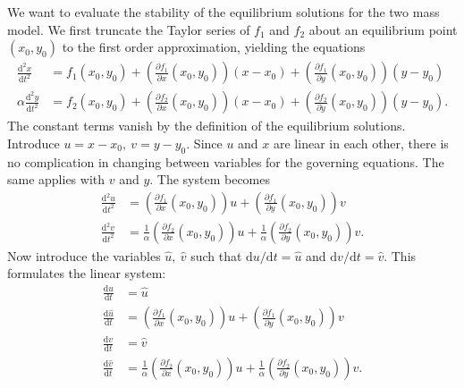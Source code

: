 \documentclass{article}
\begin{document}
We want to evaluate the stability of the equilibrium solutions for the two mass model.
We first truncate the Taylor series of \(f_1\) and \(f_2\) about an equilibrium point \((x_0,y_0)\) to the first order approximation, yielding the equations
\begin{equation}
    \begin{aligned}
        \frac{\mathrm{d}^2x}{\mathrm{d}t^2} &= f_1(x_0,y_0) + \left(\frac{\partial f_1}{\partial x}(x_0,y_0)\right)(x-x_0) + \left(\frac{\partial f_1}{\partial y}(x_0,y_0)\right)(y-y_0) \\
        \alpha\frac{\mathrm{d}^2y}{\mathrm{d}t^2} &= f_2(x_0,y_0) + \left(\frac{\partial f_2}{\partial x}(x_0,y_0)\right)(x-x_0) + \left(\frac{\partial f_2}{\partial y}(x_0,y_0)\right)(y-y_0).
    \end{aligned}
\end{equation}
The constant terms vanish by the definition of the equilibrium solutions.
Introduce \(u = x-x_0,~v=y-y_0\).
Since $u$ and $x$ are linear in each other, there is no complication in changing between variables for the governing equations.
The same applies with $v$ and $y$.
The system becomes
\begin{equation}
    \begin{aligned}
        \frac{\mathrm{d}^2u}{\mathrm{d}t^2} &= \left(\frac{\partial f_1}{\partial x}(x_0,y_0)\right)u + \left(\frac{\partial f_1}{\partial y}(x_0,y_0)\right)v \\
        \frac{\mathrm{d}^2v}{\mathrm{d}t^2} &= \frac{1}{\alpha}\left(\frac{\partial f_2}{\partial x}(x_0,y_0)\right)u + \frac{1}{\alpha}\left(\frac{\partial f_2}{\partial y}(x_0,y_0)\right)v.
    \end{aligned}
\end{equation}
Now introduce the variables $\hat{u},~\hat{v}$ such that \(\mathrm{d}u/\mathrm{d}t = \hat{u}\) and \(\mathrm{d}v/\mathrm{d}t = \hat{v}\). This formulates the linear system:
\begin{equation}
    \begin{aligned}
        \frac{\mathrm{d}u}{\mathrm{d}t} &= \hat{u} \\
        \frac{\mathrm{d}\hat{u}}{\mathrm{d}t} &= \left(\frac{\partial f_1}{\partial x}(x_0,y_0)\right)u + \left(\frac{\partial f_1}{\partial y}(x_0,y_0)\right)v \\
        \frac{\mathrm{d}v}{\mathrm{d}t} &= \hat{v} \\
        \frac{\mathrm{d}\hat{v}}{\mathrm{d}t} &= \frac{1}{\alpha}\left(\frac{\partial f_2}{\partial x}(x_0,y_0)\right)u + \frac{1}{\alpha}\left(\frac{\partial f_2}{\partial y}(x_0,y_0)\right)v.
    \end{aligned}
\end{equation}
\end{document}
